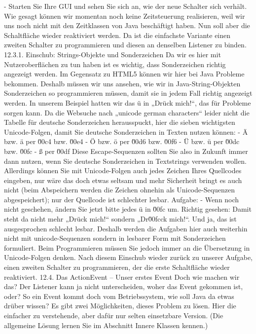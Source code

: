 -	Starten Sie Ihre GUI und sehen Sie sich an, wie der neue Schalter sich verhält.
Wie gesagt können wir momentan noch keine Zeitsteuerung realisieren, weil wir uns noch nicht mit den Zeitklassen von Java beschäftigt haben. Nun soll aber die Schaltfläche wieder reaktiviert werden. Da ist die einfachste Variante einen zweiten Schalter zu programmieren und diesen an denselben Listener zu binden.
12.3.1.	Einschub: Strings-Objekte und Sonderzeichen
Da wir es hier mit Nutzeroberflächen zu tun haben ist es wichtig, dass Sonderzeichen richtig angezeigt werden. Im Gegensatz zu HTML5 können wir hier bei Java Probleme bekommen. Deshalb müssen wir uns ansehen, wie wir in Java-String-Objekten Sonderzeichen so programmieren müssen, damit sie in jedem Fall richtig angezeigt werden.
In unserem Beispiel hatten wir das ü in „Drück mich!“, das für Probleme sorgen kann. Da die Websuche nach „unicode german characters“ leider nicht die Tabelle für deutsche Sonderzeichen herausspuckt, hier die sieben wichtigsten Unicode-Folgen, damit Sie deutsche Sonderzeichen in Texten nutzen können:
-	Ä bzw. ä per \u00c4 bzw. \u00e4
-	Ö bzw. ö per \u00d6 bzw. \u00f6
-	Ü bzw. ü per \u00dc bzw. \u00fc
-	ß per \u00df
Diese Escape-Sequenzen sollten Sie also in Zukunft immer dann nutzen, wenn Sie deutsche Sonderzeichen in Textstrings verwenden wollen. Allerdings können Sie mit Unicode-Folgen auch jedes Zeichen Ihres Quellcodes eingeben, nur wäre das doch etwas seltsam und mehr Sicherheit bringt es auch nicht (beim Abspeichern werden die Zeichen ohnehin als Unicode-Sequenzen abgespeichert); nur der Quellcode ist schlechter lesbar.
Aufgabe:
-	Wenn noch nicht geschehen, ändern Sie jetzt bitte jedes ü in \u00fc um. Richtig gesehen: Damit steht da nicht mehr „Drück mich!“ sondern „Dr\u00fcck mich!“. 
Und ja, das ist ausgesprochen schlecht lesbar. Deshalb werden die Aufgaben hier auch weiterhin nicht mit unicode-Sequenzen sondern in lesbarer Form mit Sonderzeichen formuliert. Beim Programmieren müssen Sie jedoch immer an die Übersetzung in Unicode-Folgen denken.
Nach diesem Einschub wieder zurück zu unserer Aufgabe, einen zweiten Schalter zu programmieren, der die erste Schaltfläche wieder reaktiviert.
12.4.	Das ActionEvent – Unser erstes Event
Doch wie machen wir das? Der Listener kann ja nicht unterscheiden, woher das Event gekommen ist, oder? So ein Event kommt doch vom Betriebssystem, wie soll Java da etwas drüber wissen?
Es gibt zwei Möglichkeiten, dieses Problem zu lösen. Hier die einfacher zu verstehende, aber dafür nur selten einsetzbare Version. (Die allgemeine Lösung lernen Sie im Abschnitt Innere Klassen kennen.)
